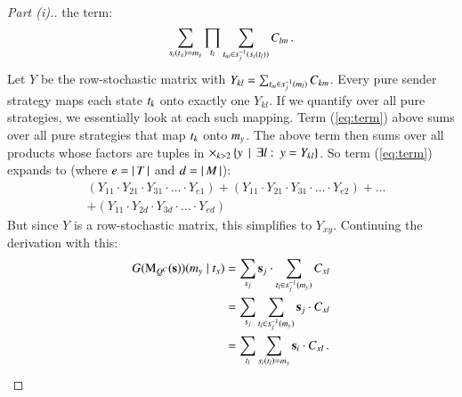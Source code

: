 \documentclass[fleqn,reqno,10pt]{article}
\renewcommand{\Smixed}{\ensuremath{\mathrm{\mathbf{s}}}}
\newcommand{\Mutate}{\ensuremath{\mathrm{M}}} %
\begin{document}
\begin{proof}[Part (i).]
  the term: 
  \begin{align}
    \label{eq:term}
    \sum_{s_i(t_x)=m_y} \prod_{t_l} \sum_{t_m
      \in s_j^{-1}(s_i(t_l))} C_{lm}\,.
  \end{align}
  Let $Y$ be the row-stochastic matrix with $Y_{kl} = \sum_{t_m
    \in s_j^{-1}(m_l)} C_{km}$. Every pure sender strategy
  maps each state $t_k$ onto exactly one $Y_{kl}$. If we quantify
  over all pure strategies, we essentially look at each such
  mapping. Term (\ref{eq:term}) above sums over all pure strategies
  that map $t_k$ onto $m_y$. The above term then sums over
  all products whose factors are tuples in $\times_{k>2} \left\{y
    \thinspace \mid \thinspace \exists l \thinspace \colon \thinspace y = Y_{kl}\right\}$. So term (\ref{eq:term})
  expands to (where $e = \left \lvert \, T \, \right\rvert$ and $d=\left \lvert \, M \, \right\rvert$):
  \begin{align*}
    & (Y_{11} \cdot Y_{21} \cdot Y_{31} \cdot \ldots \cdot Y_{e1}) +
    (Y_{11} \cdot Y_{21} \cdot Y_{31} \cdot \ldots \cdot Y_{e2}) + 
    \dots \\
    & + (Y_{11} \cdot Y_{2d} \cdot
    Y_{3d} \cdot \ldots \cdot
    Y_{ed}) 
  \end{align*}
  But since $Y$ is a row-stochastic matrix, this simplifies to
  $Y_{xy}$. Continuing the derivation with this:
  \begin{align*}
    G(\Mutate_{Q^C}(\Smixed))(\messg_y \probbar \state_x) 
    & = \sum_{\Spure_j} \Smixed_j \cdot
    \sum_{\state_l \in \Spure_j^{-1}(\messg_y)} C_{xl} \\
    & = \sum_{\Spure_j} \sum_{\state_l \in \Spure_j^{-1}(\messg_y)} \Smixed_j \cdot
     C_{xl} \\
     & = \sum_{\state_l}
    \sum_{\Spure_i(\state_l) = \messg_y} \Smixed_i \cdot C_{xl}\,.
  \end{align*}

\end{proof}
\end{document}
